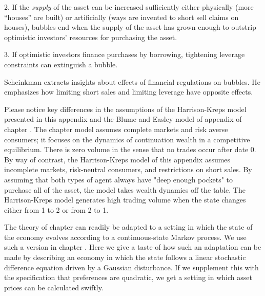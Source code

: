 \medskip

\item {2.}  If the {\it supply\/} of the asset can be increased sufficiently either physically (more ``houses'' are built) or artificially (ways are invented to short sell claims on houses), bubbles  end
when the supply of the asset has grown enough to outstrip  optimistic investors' resources for purchasing the asset.

\medskip
\item {3.} If optimistic investors  finance  purchases by borrowing, tightening leverage constraints can extinguish a bubble.

\medskip
Scheinkman extracts insights about effects of   financial regulations on bubbles. He emphasizes how limiting short sales and limiting
leverage have opposite effects.

%


Please notice
key differences in the assumptions of the Harrison-Kreps model presented in this appendix and the Blume and Easley model of appendix  of chapter .
The chapter  model assumes complete markets and  risk averse consumers; it focuses on the dynamics of continuation wealth in a competitive equilibrium.  There is
zero volume in the sense that no  trades occur after date $0$.
By way of contrast, the  Harrison-Kreps model of this appendix assumes  incomplete markets,  risk-neutral consumers, and restrictions on short sales.  By assuming that  both types
of agent always have "deep enough pockets" to purchase all of the asset, the model  takes wealth dynamics off the table.   The Harrison-Kreps model
generates  high trading volume when the state changes either from 1 to 2 or from 2 to 1.



 The theory  of chapter 
can readily be adapted to a setting in which
the state of the economy evolves according to a continuous-state
 Markov process.   We use such a version in chapter .
Here we give a taste of how  such an adaptation can be made
by describing an economy in which the state follows a linear stochastic
difference equation driven by a Gaussian  disturbance.  If we supplement
this with the specification that preferences are quadratic,
we get a setting in which asset prices can be calculated swiftly.




